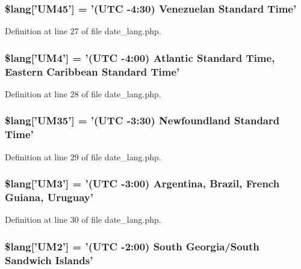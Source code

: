 \subsubsection[{\$lang}]{\setlength{\rightskip}{0pt plus 5cm}\$lang['U\-M45'] = '(U\-T\-C -\/4\-:30) Venezuelan Standard Time'}\label{date__lang_8php_aac9f8a1e0da4b3cee00a19fe9ac642d0}


Definition at line 27 of file date\-\_\-lang.\-php.

\subsubsection[{\$lang}]{\setlength{\rightskip}{0pt plus 5cm}\$lang['U\-M4'] = '(U\-T\-C -\/4\-:00) Atlantic Standard Time, Eastern Caribbean Standard Time'}\label{date__lang_8php_a42f66872f4a082bcb2ee004bd2716828}


Definition at line 28 of file date\-\_\-lang.\-php.

\subsubsection[{\$lang}]{\setlength{\rightskip}{0pt plus 5cm}\$lang['U\-M35'] = '(U\-T\-C -\/3\-:30) Newfoundland Standard Time'}\label{date__lang_8php_a389c4a60af83efd29503f60033f3071d}


Definition at line 29 of file date\-\_\-lang.\-php.

\subsubsection[{\$lang}]{\setlength{\rightskip}{0pt plus 5cm}\$lang['U\-M3'] = '(U\-T\-C -\/3\-:00) Argentina, Brazil, French Guiana, Uruguay'}\label{date__lang_8php_abd67512895187d494bbfb18f8d8fee43}


Definition at line 30 of file date\-\_\-lang.\-php.

\subsubsection[{\$lang}]{\setlength{\rightskip}{0pt plus 5cm}\$lang['U\-M2'] = '(U\-T\-C -\/2\-:00) South Georgia/South Sandwich Islands'}\label{date__lang_8php_a8ee2f132b462bb709fc3402a592ff573}


